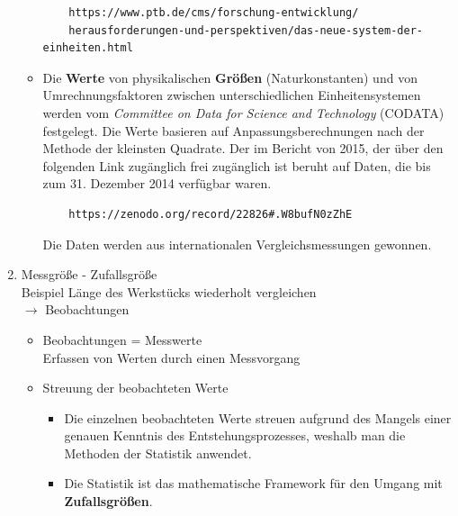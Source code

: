 \documentclass[a4paper,12pt,DIV=15]{scrartcl}
\begin{document}
\begin{enumerate}
\begin{itemize}
	\begin{verbatim}
	https://www.ptb.de/cms/forschung-entwicklung/
	herausforderungen-und-perspektiven/das-neue-system-der-einheiten.html
	\end{verbatim}
		\item Die \textbf{Werte} von physikalischen \textbf{Größen} (Naturkonstanten) 
			und von Umrechnungsfaktoren zwischen unterschiedlichen
			Einheitensystemen werden vom \textsl{Committee on Data for Science and Technology} (CODATA)
			festgelegt. Die Werte basieren auf Anpassungsberechnungen nach der Methode der kleinsten
			Quadrate. Der im Bericht von 2015, der über den folgenden Link zugänglich frei zugänglich ist
			beruht auf Daten, die bis zum 31. Dezember 2014 verfügbar waren.
	\begin{verbatim}
	https://zenodo.org/record/22826#.W8bufN0zZhE
	\end{verbatim}
			Die Daten werden aus internationalen Vergleichsmessungen gewonnen.
	\end{itemize}
\item Messgröße - Zufallsgröße\\
Beispiel Länge des Werkstücks wiederholt vergleichen\\
$\rightarrow$ Beobachtungen
\begin{itemize}
	\item Beobachtungen = Messwerte\\
		Erfassen von Werten durch einen Messvorgang
	\item Streuung der beobachteten Werte
		\begin{itemize}
		\item Die einzelnen beobachteten Werte streuen aufgrund des Mangels einer genauen
		Kenntnis des Entstehungsprozesses, weshalb man die Methoden der Statistik anwendet.
		\item Die Statistik ist das mathematische Framework für den Umgang mit \textbf{Zufallsgrößen}.
	\end{itemize}


\end{itemize}
\end{enumerate}
\end{document}
